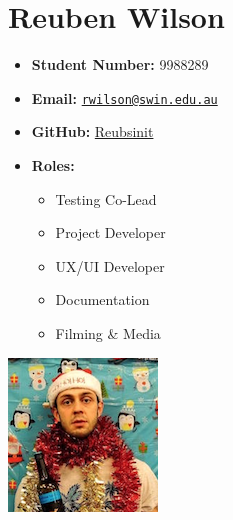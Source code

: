 \documentclass[a4paper,12pt]{article}
\providecommand{\tightlist}{%
  \setlength{\itemsep}{0pt}\setlength{\parskip}{0pt}}
\begin{document}
\begin{minipage}{0.7\textwidth}
\section{Reuben Wilson}\label{reuben-wilson}
\begin{itemize}[label={}]
\tightlist
\item
  \textbf{Student Number:} 9988289
\item
  \textbf{Email:}
  \href{mailto:rwilson@swin.edu.au}{\nolinkurl{rwilson@swin.edu.au}}
\item
  \textbf{GitHub:} \href{http://www.github.com/Reubsinit}{Reubsinit}
  \item
    \textbf{Roles:}
    \begin{itemize}
      \item Testing Co-Lead
      \item Project Developer
      \item UX/UI Developer
      \item Documentation
      \item Filming \& Media
    \end{itemize}
\end{itemize}
\end{minipage}%
\begin{minipage}{0.3\textwidth}
\includegraphics{./imgs/reubs.png}
\end{minipage}
\end{document}
